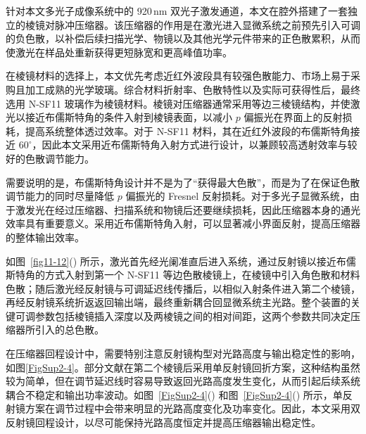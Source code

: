 针对本文多光子成像系统中的 920\,nm 双光子激发通道，本文在腔外搭建了一套独立的棱镜对脉冲压缩器。该压缩器的作用是在激光进入显微系统之前预先引入可调的负色散，以补偿后续扫描光学、物镜以及其他光学元件带来的正色散累积，从而使激光在样品处重新获得更短脉宽和更高峰值功率。

在棱镜材料的选择上，本文优先考虑近红外波段具有较强色散能力、市场上易于采购且加工成熟的光学玻璃。综合材料折射率、色散特性以及实际可获得性后，最终选用 N-SF11 玻璃作为棱镜材料。棱镜对压缩器通常采用等边三棱镜结构，并使激光以接近布儒斯特角的条件入射到棱镜表面，以减小 $p$ 偏振光在界面上的反射损耗，提高系统整体透过效率。对于 N-SF11 材料，其在近红外波段的布儒斯特角接近 $60^\circ$，因此本文采用近布儒斯特角入射方式进行设计，以兼顾较高透射效率与较好的色散调节能力。

需要说明的是，布儒斯特角设计并不是为了``获得最大色散''，而是为了在保证色散调节能力的同时尽量降低 $p$ 偏振光的 Fresnel 反射损耗。对于多光子显微系统，由于激发光在经过压缩器、扫描系统和物镜后还要继续损耗，因此压缩器本身的通光效率具有重要意义。采用近布儒斯特角入射，可以显著减小界面反射，提高压缩器的整体输出效率。

如图~\ref{fig11-12}() 所示，激光首先经光阑准直后进入系统，通过反射镜以接近布儒斯特角的方式入射到第一个 N-SF11 等边色散棱镜上，在棱镜中引入角色散和材料色散；随后激光经反射镜与可调延迟线传播后，以相似入射条件进入第二个棱镜，再经反射镜系统折返返回输出端，最终重新耦合回显微系统主光路。整个装置的关键可调参数包括棱镜插入深度以及两棱镜之间的相对间距，这两个参数共同决定压缩器所引入的总色散。

在压缩器回程设计中，需要特别注意反射镜构型对光路高度与输出稳定性的影响，如图\ref{FigSup2-4}。部分文献在第二个棱镜后采用单反射镜回折方案，这种结构虽然较为简单，但在调节延迟线时容易导致返回光路高度发生变化，从而引起后续系统耦合不稳定和输出功率波动。如图~\ref{FigSup2-4}() 和图~\ref{FigSup2-4}() 所示，单反射镜方案在调节过程中会带来明显的光路高度变化及功率变化。因此，本文采用双反射镜回程设计，以尽可能保持光路高度恒定并提高压缩器输出稳定性。

